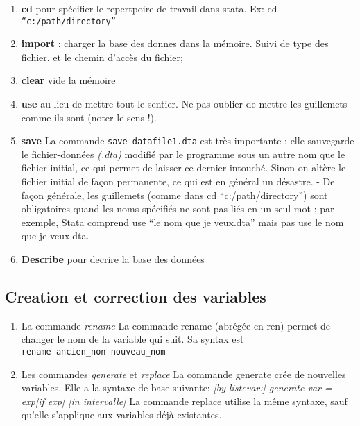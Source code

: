 \documentclass[
]{book}
\providecommand{\tightlist}{%
  \setlength{\itemsep}{0pt}\setlength{\parskip}{0pt}}
\begin{document}
\begin{enumerate}
\def\labelenumi{(\arabic{enumi})}
\setcounter{enumi}{-1}
\tightlist
\item
  \textbf{cd} pour spécifier le repertpoire de travail dans stata. Ex: cd \texttt{“c:/path/directory”}
\item
  \textbf{import} : charger la base des donnes dans la mémoire. Suivi de type des fichier. et le chemin d'accès du fichier;
\item
  \textbf{clear} vide la mémoire
\item
  \textbf{use} au lieu de mettre tout le sentier. Ne pas oublier de mettre les guillemets comme ils sont (noter le sens !).
\item
  \textbf{save} La commande \texttt{save\ datafile1.dta} est très importante : elle sauvegarde le fichier-données \emph{(.dta)} modifié par le programme sous un autre nom que le fichier initial, ce qui permet de laisser ce dernier intouché. Sinon on altère le fichier initial de façon permanente, ce qui est en général un désastre. - De façon générale, les guillemets (comme dans cd ``c:/path/directory'') sont obligatoires quand les noms spécifiés ne sont pas liés en un seul mot ; par exemple, Stata comprend use ``le nom que je veux.dta'' mais pas use le nom que je veux.dta.
\item
  \textbf{Describe} pour decrire la base des données
\end{enumerate}

\hypertarget{creation-et-correction-des-variables}{%
\subsection{Creation et correction des variables}\label{creation-et-correction-des-variables}}

\begin{enumerate}
\def\labelenumi{(\arabic{enumi})}
\item
  La commande \emph{rename}
  La commande rename (abrégée
  en ren) permet de changer le nom de la variable qui suit. Sa syntax est
  \texttt{rename\ ancien\_non\ nouveau\_nom}
\item
  Les commandes \emph{generate} et \emph{replace}
  La commande generate crée de nouvelles variables. Elle a la syntaxe de base suivante:
  \emph{{[}by listevar:{]} generate var = exp{[}if exp{]} {[}in intervalle{]}}
  La commande replace utilise la même syntaxe, sauf qu'elle s'applique aux variables déjà existantes.
\end{enumerate}
\end{document}
